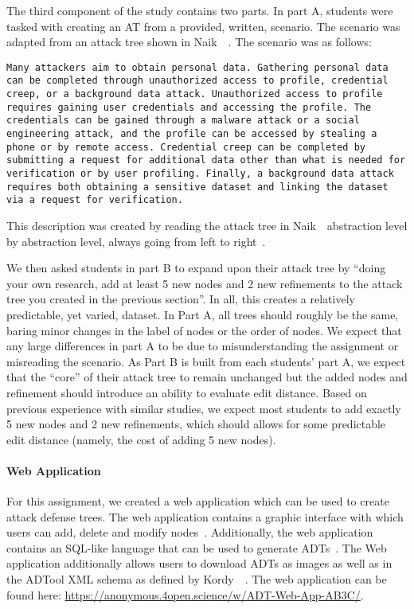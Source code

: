 The third component of the study contains two parts. In part A, students were tasked with creating an AT from a provided, written, scenario. The scenario was adapted from an attack tree shown in Naik~\etal~\cite{naikEvaluationPotentialAttack2022}. The scenario was as follows:

\texttt{Many attackers aim to obtain personal data. Gathering personal data can be completed through unauthorized access to profile, credential creep, or a background data attack. Unauthorized access to profile requires gaining user credentials and accessing the profile. The credentials can be gained through a malware attack or a social engineering attack, and the profile can be accessed by stealing a phone or by remote access. Credential creep can be completed by submitting a request for additional data other than what is needed for verification or by user profiling. Finally, a background data attack requires both obtaining a sensitive dataset and linking the dataset via a request for verification.}

This description was created by reading the attack tree in Naik~\etal\ abstraction level by abstraction level, always going from left to right~\cite{naikEvaluationPotentialAttack2022}. 

We then asked students in part B to expand upon their attack tree by ``doing your own research, add at least 5 new nodes and 2 new refinements to the attack tree you created in the previous section''. In all, this creates a relatively predictable, yet varied, dataset. In Part A, all trees should roughly be the same, baring minor changes in the label of nodes or the order of nodes. We expect that any large differences in part A to be due to misunderstanding the assignment or misreading the scenario. As Part B is built from each students' part A, we expect that the ``core'' of their attack tree to remain unchanged but the added nodes and refinement should introduce an ability to evaluate edit distance. Based on previous experience with similar studies, we expect most students to add exactly 5 new nodes and 2 new refinements, which should allows for some predictable edit distance (namely, the cost of adding 5 new nodes).

\paragraph{Web Application}

For this assignment, we created a web application which can be used to create attack defense trees. The web application contains a graphic interface with which users can add, delete and modify nodes~\cite{mohalaiaImplementingUserInterface2023}. Additionally, the web application contains an SQL-like language that can be used to generate ADTs~\cite{mezaADTLangDeclarativeLanguage2023}. The Web application additionally allows users to download ADTs as images as well as in the ADTool XML schema as defined by Kordy~\etal~\cite{kordy_adtool_2013}. The web application can be found here: \url{https://anonymous.4open.science/w/ADT-Web-App-AB3C/}.

